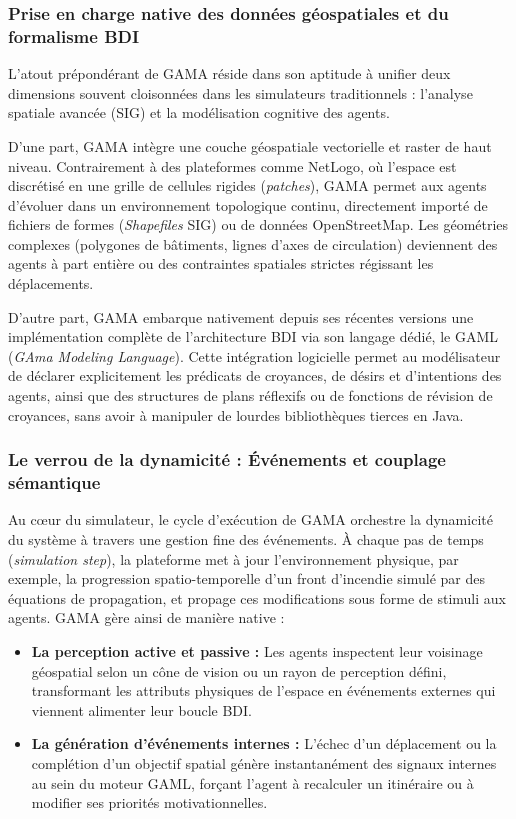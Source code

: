 \documentclass{article}
\begin{document}
\subsubsection{Prise en charge native des données géospatiales et du formalisme BDI}

L'atout prépondérant de GAMA réside dans son aptitude à unifier deux dimensions souvent cloisonnées dans les simulateurs traditionnels : l'analyse spatiale avancée (SIG) et la modélisation cognitive des agents. 

D'une part, GAMA intègre une couche géospatiale vectorielle et raster de haut niveau. Contrairement à des plateformes comme NetLogo, où l'espace est discrétisé en une grille de cellules rigides (\textit{patches}), GAMA permet aux agents d'évoluer dans un environnement topologique continu, directement importé de fichiers de formes (\textit{Shapefiles} SIG) ou de données OpenStreetMap. Les géométries complexes (polygones de bâtiments, lignes d'axes de circulation) deviennent des agents à part entière ou des contraintes spatiales strictes régissant les déplacements.

D'autre part, GAMA embarque nativement depuis ses récentes versions une implémentation complète de l'architecture BDI via son langage dédié, le GAML (\textit{GAma Modeling Language}). Cette intégration logicielle permet au modélisateur de déclarer explicitement les prédicats de croyances, de désirs et d'intentions des agents, ainsi que des structures de plans réflexifs ou de fonctions de révision de croyances, sans avoir à manipuler de lourdes bibliothèques tierces en Java.

\subsubsection{Le verrou de la dynamicité : Événements et couplage sémantique}

Au cœur du simulateur, le cycle d'exécution de GAMA orchestre la dynamicité du système à travers une gestion fine des événements. À chaque pas de temps (\textit{simulation step}), la plateforme met à jour l'environnement physique, par exemple, la progression spatio-temporelle d'un front d'incendie simulé par des équations de propagation, et propage ces modifications sous forme de stimuli aux agents. GAMA gère ainsi de manière native :
\begin{itemize}
    \item \textbf{La perception active et passive :} Les agents inspectent leur voisinage géospatial selon un cône de vision ou un rayon de perception défini, transformant les attributs physiques de l'espace en événements externes qui viennent alimenter leur boucle BDI.
    \item \textbf{La génération d'événements internes :} L'échec d'un déplacement ou la complétion d'un objectif spatial génère instantanément des signaux internes au sein du moteur GAML, forçant l'agent à recalculer un itinéraire ou à modifier ses priorités motivationnelles.
\end{itemize}
\end{document}
